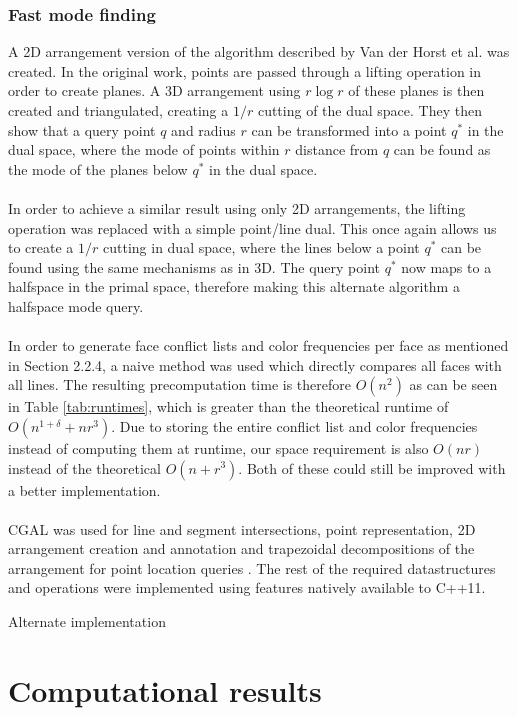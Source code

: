 \documentclass{article}
\begin{document}
\subsubsection{Fast mode finding}
A 2D arrangement version of the algorithm described by Van der Horst et al. was
created. In the original work, points are passed through a lifting operation in
order to create planes. A 3D arrangement using $r \log r$ of these planes is
then created and triangulated, creating a $1/r$ cutting of the dual space. They
then show that a query point $q$ and radius $r$ can be transformed into a point
$q^*$ in the dual space, where the mode of points within $r$ distance from $q$
can be found as the mode of the planes below $q^*$ in the dual space. \\\\ In
order to achieve a similar result using only 2D arrangements, the lifting
operation was replaced with a simple point/line dual. This once again allows us
to create a $1/r$ cutting in dual space, where the lines below a point $q^*$
can be found using the same mechanisms as in 3D. The query point $q^*$ now maps
to a halfspace in the primal space, therefore making this alternate algorithm a
halfspace mode query. \\\\ In order to generate face conflict lists and color
frequencies per face as mentioned in Section 2.2.4, a naive method was used
which directly compares all faces with all lines. The resulting precomputation
time is therefore $O(n^2)$ as can be seen in Table \ref{tab:runtimes}, which is
greater than the theoretical runtime of $O(n^{1+\delta}+nr^3)$. Due to storing
the entire conflict list and color frequencies instead of computing them at
runtime, our space requirement is also $O(nr)$ instead of the theoretical $O(n
    + r^3)$. Both of these could still be improved with a better implementation.
\\\\ CGAL was used for line and segment intersections, point representation, 2D
arrangement creation and annotation and trapezoidal decompositions of the
arrangement for point location queries \cite{cgal:foundations}
\cite{cgal:numbertypes} \cite{cgal:arrangement}. The rest of the required
datastructures and operations were implemented using features natively
available to C++11.

Alternate implementation
\section{Computational results}
\end{document}
